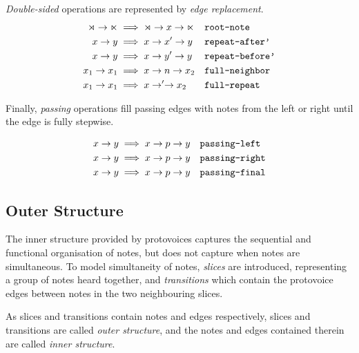 \documentclass[12pt,a4paper,twoside,openright]{report}
\theoremstyle{definition}
\begin{document}
\textit{Double-sided} operations are represented by \textit{edge replacement}. 
\begin{equation}
  \begin{aligned}
    \rtimes \to \ltimes &\implies \rtimes \to x \to \ltimes && \text{\texttt{root-note}}
  \label{eq:rootNote} \\
    x \to y &\implies x \to x' \to y && \text{\texttt{repeat-after'}}
  \label{eq:repeatAfter'}\\
    x \to y &\implies x \to y' \to y && \text{\texttt{repeat-before'}}
  \label{eq:repeatBefore'}\\
    x_1 \to x_1 &\implies x \to n \to x_2 && \text{\texttt{full-neighbor}}
  \label{eq:full-neighbor}\\
    x_1 \to x_1 &\implies x \to ' \to x_2 && \text{\texttt{full-repeat}}
  \label{eq:full-repeat}\\
  \end{aligned} 
  \label{eq:doublesidedinnerop}
\end{equation}

Finally, \textit{passing} operations fill passing edges with notes from the left or right until the edge is fully stepwise.

\begin{equation}
  \begin{aligned}
    x \to y &\implies x \to p \to y && \text{\texttt{passing-left}}
  \label{eq:passing-left}\\
    x \to y &\implies x \to p \to y && \text{\texttt{passing-right}}
  \label{eq:passing-right}\\
    x \to y &\implies x \to p \to y && \text{\texttt{passing-final}}
  \label{eq:passing-final}\\
  \end{aligned} 
\end{equation}
\subsection{Outer Structure}
\label{sub:Outer Structure}

The inner structure provided by protovoices captures the sequential and functional organisation of notes, but does not capture when notes are simultaneous. To model simultaneity of notes, \textit{slices} are introduced, representing a group of notes heard together, and \textit{transitions} which contain the protovoice edges between notes in the two neighbouring slices. 
\par
As slices and transitions contain notes and edges respectively, slices and transitions are called \textit{outer structure}, and the notes and edges contained therein are called \textit{inner structure}.
\end{document}
